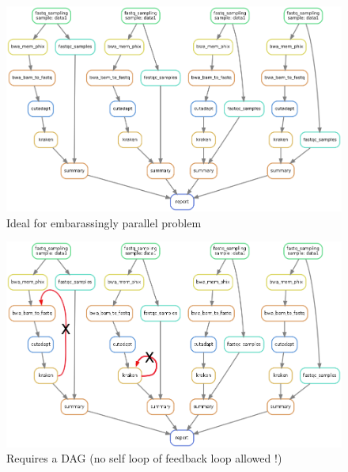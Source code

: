 \documentclass{beamer}
\begin{document}
\begin{frame}
{\begin{figure}
                \includegraphics[width=\textwidth,height=0.6\textheight]{images/dag_2.png}
                \caption[1]{Ideal for embarassingly parallel problem}
            \end{figure}                
        }
        {
            \begin{figure}
                \includegraphics[width=\textwidth,height=0.6\textheight]{images/dag_wrong2.png}
                \caption[2]{Requires a DAG (no self loop of feedback loop allowed !)}
            \end{figure}
        }
\end{frame}




\end{document}
